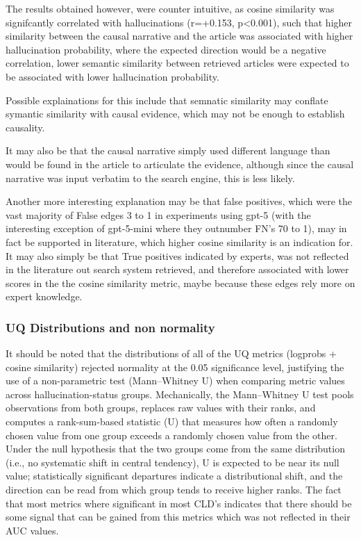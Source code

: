 The results obtained however, were counter intuitive, as cosine similarity was signifcantly correlated with hallucinations (r=+0.153, p<0.001), such that higher similarity between the causal narrative and the article was associated with higher hallucination probability, where the expected direction would be a negative correlation, lower semantic similarity between retrieved articles were expected to be associated with lower hallucination probability.

Possible explainations for this include that semnatic similarity may conflate symantic similarity with causal evidence, which may not be enough to establish causality.

It may also be that the causal narrative simply used different language than would be found in the article to articulate the evidence, although since the causal narrative was input verbatim to the search engine, this is less likely.

Another more interesting explanation may be that false positives, which were the vast majority of False edges 3 to 1 in experiments using gpt-5 (with the interesting exception of gpt-5-mini where they outnumber FN's 70 to 1), may in fact be supported in literature, which higher cosine similarity is an indication for. It may also simply be that True positives indicated by experts, was not reflected in the literature out search system retrieved, and therefore associated with lower scores in the the cosine similarity metric, maybe because these edges rely more on expert knowledge.

\subsubsection{UQ Distributions and non normality}

It should be noted that the distributions of all of the UQ metrics (logprobs + cosine similarity) rejected normality at the 0.05 significance level, justifying the use of a non-parametric test (Mann--Whitney U) when comparing metric values across hallucination-status groups. Mechanically, the Mann--Whitney U test pools observations from both groups, replaces raw values with their ranks, and computes a rank-sum-based statistic (U) that measures how often a randomly chosen value from one group exceeds a randomly chosen value from the other. Under the null hypothesis that the two groups come from the same distribution (i.e., no systematic shift in central tendency), U is expected to be near its null value; statistically significant departures indicate a distributional shift, and the direction can be read from which group tends to receive higher ranks. The fact that most metrics where significant in most CLD's indicates that there should be some signal that can be gained from this metrics which was not reflected in their AUC values.

